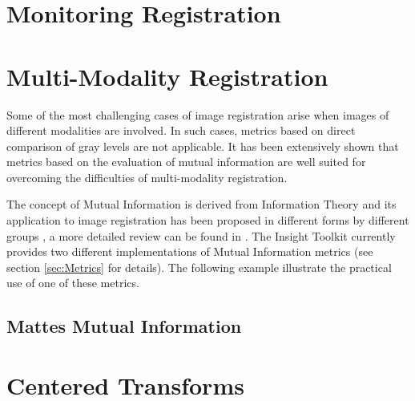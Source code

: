 \section{Monitoring Registration}
\label{sec:MonitoringImageRegistration}
\ifitkFullVersion

\fi



\section{Multi-Modality Registration}
\label{sec:MultiModalityRegistration}

Some of the most challenging cases of image registration arise when images of
different modalities are involved. In such cases, metrics based on direct
comparison of gray levels are not applicable. It has been extensively shown
that metrics based on the evaluation of mutual information are well suited for
overcoming the difficulties of multi-modality registration.


The concept of Mutual Information is derived from Information Theory and its
application to image registration has been proposed in different forms by
different groups \cite{Collignon1995,Maes97,Viola1997}, a more detailed review
can be found in \cite{Hajnal2001,Pluim2003}. The Insight Toolkit currently
provides two different implementations of Mutual Information metrics (see
section \ref{sec:Metrics} for details). The following example illustrate the
practical use of one of these metrics.

\subsection{Mattes Mutual Information}
\label{sec:MultiModalityRegistrationMattes}
\ifitkFullVersion

\fi

% 


\section{ Centered Transforms }


